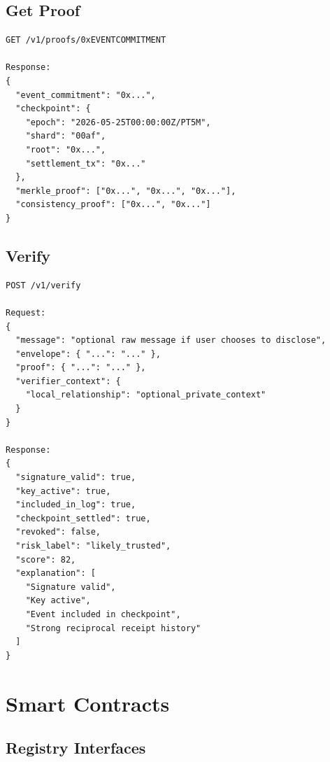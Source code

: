 \documentclass[11pt]{article}
\begin{document}
\subsection{Get Proof}

\begin{lstlisting}[style=tslcode]
GET /v1/proofs/0xEVENTCOMMITMENT

Response:
{
  "event_commitment": "0x...",
  "checkpoint": {
    "epoch": "2026-05-25T00:00:00Z/PT5M",
    "shard": "00af",
    "root": "0x...",
    "settlement_tx": "0x..."
  },
  "merkle_proof": ["0x...", "0x...", "0x..."],
  "consistency_proof": ["0x...", "0x..."]
}
\end{lstlisting}

\subsection{Verify}

\begin{lstlisting}[style=tslcode]
POST /v1/verify

Request:
{
  "message": "optional raw message if user chooses to disclose",
  "envelope": { "...": "..." },
  "proof": { "...": "..." },
  "verifier_context": {
    "local_relationship": "optional_private_context"
  }
}

Response:
{
  "signature_valid": true,
  "key_active": true,
  "included_in_log": true,
  "checkpoint_settled": true,
  "revoked": false,
  "risk_label": "likely_trusted",
  "score": 82,
  "explanation": [
    "Signature valid",
    "Key active",
    "Event included in checkpoint",
    "Strong reciprocal receipt history"
  ]
}
\end{lstlisting}

\section{Smart Contracts}

\subsection{Registry Interfaces}
\end{document}
